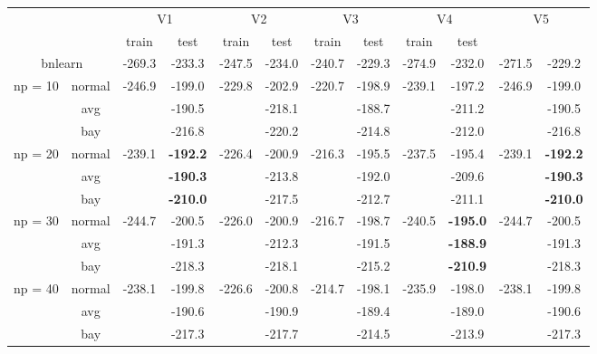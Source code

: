 \documentclass[]{scrartcl}
\begin{document}
\begin{scriptsize}
\begin{center}
\begin{tabular}{cc|cc|cc|cc|cc|cc}
 & & \multicolumn{2}{c}{V1} & \multicolumn{2}{c}{V2} & \multicolumn{2}{c}{V3} & \multicolumn{2}{c}{V4} & \multicolumn{2}{c}{V5} \\
 &  & train & test  & train & test  & train & test  & train & test  \\
\multicolumn{2}{c|}{bnlearn}  & -269.3 & -233.3 & -247.5 & -234.0 & -240.7 & -229.3 & -274.9 & -232.0 & -271.5 & -229.2 \\\hline\hline
       \multirow{3}{*}{np = 10} & normal & -246.9& -199.0& -229.8 & -202.9 & -220.7 & -198.9 & -239.1 & -197.2 & -246.9 & -199.0 \\
                                                    & avg        & & -190.5& & -218.1& & -188.7 & & -211.2 & & -190.5\\
                                                    & bay        & & -216.8& & -220.2 & & -214.8& & -212.0 & & -216.8 \\\cline{1-12}
    \multirow{3}{*}{np = 20} & normal & -239.1& \textbf{-192.2}& -226.4 & -200.9 & -216.3 & -195.5 & -237.5 & -195.4 & -239.1 & \textbf{-192.2}\\
    												 & avg        & & \textbf{-190.3 }& & -213.8 & & -192.0 & & -209.6 & & \textbf{-190.3}\\
                                                      & bay        & & \textbf{-210.0} & & -217.5 & & -212.7 & & -211.1 & & \textbf{-210.0 }\\\cline{1-12}
   \multirow{3}{*}{np = 30} & normal & -244.7 & -200.5 & -226.0 & -200.9 & -216.7 & -198.7 & -240.5 & \textbf{-195.0} & -244.7& -200.5\\
    												 & avg        & & -191.3 & & -212.3 & & -191.5 & & \textbf{-188.9} & & -191.3\\
                                                      & bay        & & -218.3 & & -218.1 & & -215.2 & &\textbf{ -210.9} & & -218.3\\\cline{1-12}
   \multirow{3}{*}{np = 40} & normal & -238.1 & -199.8 & -226.6 & -200.8 & -214.7 & -198.1 & -235.9 & -198.0 & -238.1 & -199.8 \\
    												& avg        & & -190.6& & -190.9& & -189.4 & & -189.0 & & -190.6\\
                                                     & bay        & & -217.3 & & -217.7& & -214.5 & & -213.9 & & -217.3\\                                                                                                                
\end{tabular}
\end{center}
\end{scriptsize}
\end{document}
